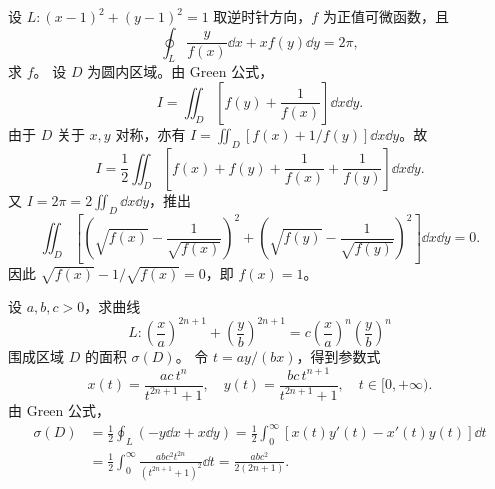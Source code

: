 设 $L:(x-1)^2+(y-1)^2=1$ 取逆时针方向，$f$ 为正值可微函数，且
\[
\oint_L\frac{y}{f(x)}\dd x+xf(y)\dd y=2\pi,
\]
求 $f$。
\sol 设 $D$ 为圆内区域。由 Green 公式，
\[
I=\iint_D\left[f(y)+\frac1{f(x)}\right]\dd x\dd y.
\]
由于 $D$ 关于 $x,y$ 对称，亦有 $I=\iint_D[f(x)+1/f(y)]\dd x\dd y$。故
\[
I=\frac12\iint_D\left[f(x)+f(y)+\frac1{f(x)}+\frac1{f(y)}\right]\dd x\dd y.
\]
又 $I=2\pi=2\iint_D\dd x\dd y$，推出
\[
\iint_D\left[\left(\sqrt{f(x)}-\frac1{\sqrt{f(x)}}\right)^2
+\left(\sqrt{f(y)}-\frac1{\sqrt{f(y)}}\right)^2\right]\dd x\dd y=0.
\]
因此 $\sqrt{f(x)}-1/\sqrt{f(x)}=0$，即 $f(x)=1$。

设 $a,b,c>0$，求曲线
\[
L:\left(\frac xa\right)^{2n+1}+\left(\frac yb\right)^{2n+1}
=c\left(\frac xa\right)^n\left(\frac yb\right)^n
\]
围成区域 $D$ 的面积 $\sigma(D)$。
\sol 令 $t=ay/(bx)$，得到参数式
\[
x(t)=\frac{ac\,t^n}{t^{2n+1}+1},\quad y(t)=\frac{bc\,t^{n+1}}{t^{2n+1}+1},\quad t\in[0,+\infty).
\]
由 Green 公式，
\begin{align*}
\sigma(D)&=\frac12\oint_L(-y\dd x+x\dd y)
=\frac12\int_0^\infty[x(t)y'(t)-x'(t)y(t)]\dd t\\
&=\frac12\int_0^\infty\frac{abc^2t^{2n}}{(t^{2n+1}+1)^2}\dd t
=\frac{abc^2}{2(2n+1)}.
\end{align*}

